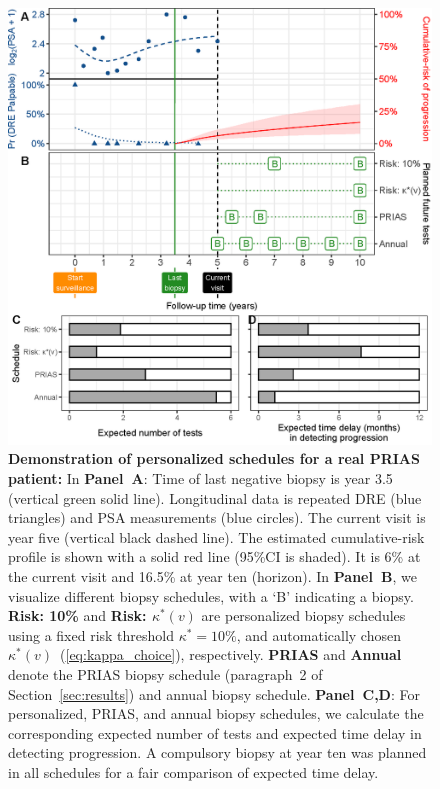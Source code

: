 \begin{figure}
\centerline{\includegraphics{images/demo_schedule.eps}}
\caption{\textbf{Demonstration of personalized schedules for a real PRIAS patient:} In \textbf{Panel~A}: Time of last negative biopsy is year 3.5 (vertical green solid line). Longitudinal data is repeated DRE (blue triangles) and PSA measurements (blue circles). The current visit is year five (vertical black dashed line). The estimated cumulative-risk profile is shown with a solid red line (95\%CI is shaded). It is 6\% at the current visit and 16.5\% at year ten (horizon). In \textbf{Panel~B}, we visualize different biopsy schedules, with a `B' indicating a biopsy. \textbf{Risk: 10\%} and \textbf{Risk: $\kappa^*(v)$} are personalized biopsy schedules using a fixed risk threshold $\kappa^*=10\%$, and automatically chosen $\kappa^*(v)$~(\ref{eq:kappa_choice}), respectively. \textbf{PRIAS} and \textbf{Annual} denote the PRIAS biopsy schedule (paragraph~2 of Section~\ref{sec:results}) and annual biopsy schedule. \textbf{Panel~C,D}: For personalized, PRIAS, and annual biopsy schedules, we calculate the corresponding expected number of tests and expected time delay in detecting progression. A compulsory biopsy at year ten was planned in all schedules for a fair comparison of expected time delay.}\label{fig:demo_schedule}
\end{figure}